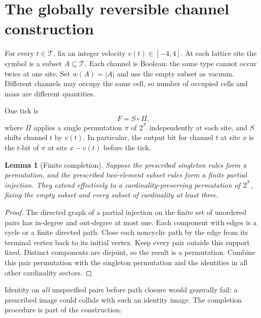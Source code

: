 \documentclass[11pt,letterpaper]{article}
\numberwithin{equation}{section}
\newtheorem{lemma}[theorem]{Lemma}
\theoremstyle{definition}
\theoremstyle{remark}
\begin{document}
\section{The globally reversible channel construction}\label{smc:tm:sec:global}

For every $t\in\mathcal T$, fix an integer velocity $v(t)\in[-4,4]$. At each lattice site the symbol is a subset $A\subseteq\mathcal T$. Each channel is Boolean: the same type cannot occur twice at one site. Set $w(A)=|A|$ and use the empty subset as vacuum. Different channels may occupy the same cell, so number of occupied cells and mass are different quantities.

One tick is
\begin{equation}\label{smc:tm:eq:global}
F=S\circ\Pi,
\end{equation}
where $\Pi$ applies a single permutation $\pi$ of $2^{\mathcal T}$ independently at each site, and $S$ shifts channel $t$ by $v(t)$. In particular, the output bit for channel $t$ at site $x$ is the $t$-bit of $\pi$ at site $x-v(t)$ before the tick.

\begin{lemma}[Finite completion]\label{smc:tm:lem:completion}
Suppose the prescribed singleton rules form a permutation, and the prescribed two-element subset rules form a finite partial injection. They extend effectively to a cardinality-preserving permutation of $2^{\mathcal T}$, fixing the empty subset and every subset of cardinality at least three.
\end{lemma}
\begin{proof}
The directed graph of a partial injection on the finite set of unordered pairs has in-degree and out-degree at most one. Each component with edges is a cycle or a finite directed path. Close each noncyclic path by the edge from its terminal vertex back to its initial vertex. Keep every pair outside this support fixed. Distinct components are disjoint, so the result is a permutation. Combine this pair permutation with the singleton permutation and the identities in all other cardinality sectors.
\end{proof}

Identity on \emph{all} unspecified pairs before path closure would generally fail: a prescribed image could collide with such an identity image. The completion procedure is part of the construction.
\end{document}
